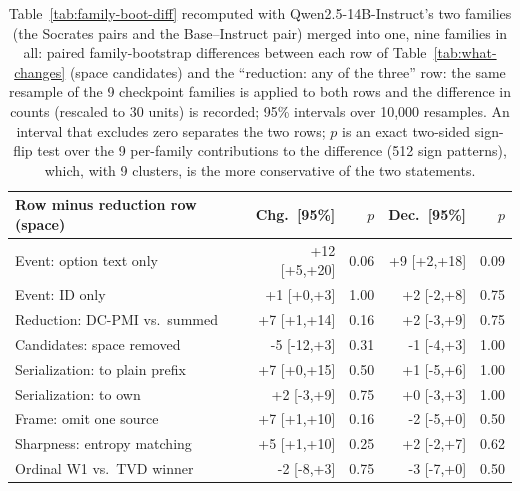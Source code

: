 \begin{table}[t]
\centering\scriptsize
\setlength{\tabcolsep}{2pt}
\begin{tabular}{@{}lrrrr@{}}
\toprule
Row minus reduction row (space) & Chg.\ [95\%] & $p$ & Dec.\ [95\%] & $p$ \\
\midrule
Event: option text only & +12 [+5,+20] & 0.06 & +9 [+2,+18] & 0.09 \\
Event: ID only & +1 [+0,+3] & 1.00 & +2 [-2,+8] & 0.75 \\
Reduction: DC-PMI vs.\ summed & +7 [+1,+14] & 0.16 & +2 [-3,+9] & 0.75 \\
Candidates: space removed & -5 [-12,+3] & 0.31 & -1 [-4,+3] & 1.00 \\
Serialization: to plain prefix & +7 [+0,+15] & 0.50 & +1 [-5,+6] & 1.00 \\
Serialization: to own & +2 [-3,+9] & 0.75 & +0 [-3,+3] & 1.00 \\
Frame: omit one source & +7 [+1,+10] & 0.16 & -2 [-5,+0] & 0.50 \\
Sharpness: entropy matching & +5 [+1,+10] & 0.25 & +2 [-2,+7] & 0.62 \\
Ordinal W1 vs.\ TVD winner & -2 [-8,+3] & 0.75 & -3 [-7,+0] & 0.50 \\
\bottomrule
\end{tabular}
\caption{Table~\ref{tab:family-boot-diff} recomputed with Qwen2.5-14B-Instruct's two families (the Socrates pairs and the Base--Instruct pair) merged into one, nine families in all: paired family-bootstrap differences between each row of Table~\ref{tab:what-changes} (space candidates) and the ``reduction: any of the three'' row: the same resample of the 9 checkpoint families is applied to both rows and the difference in counts (rescaled to 30 units) is recorded; 95\% intervals over 10,000 resamples. An interval that excludes zero separates the two rows; $p$ is an exact two-sided sign-flip test over the 9 per-family contributions to the difference (512 sign patterns), which, with 9 clusters, is the more conservative of the two statements.}
\label{tab:family-boot-diff-merged}
\end{table}
